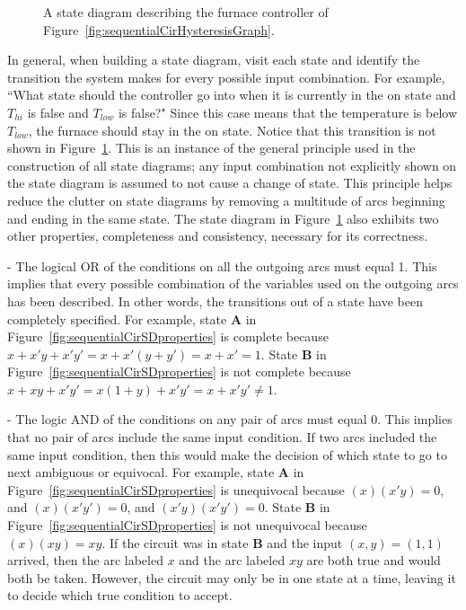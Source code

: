 \begin{figure}[ht]
    \caption{A state diagram describing the furnace controller of
    Figure~\ref{fig:sequentialCirHysteresisGraph}.}
    \label{fig:sequentialCirHysteresisSD}
\end{figure}

In general, when building a state diagram, visit each state
and identify the transition the system makes for every possible
input combination.  For example, ``What state should the controller go into
when it is currently in the on state and $T_{hi}$ is false and $T_{low}$ is
false?" Since this case means that the temperature is below $T_{low}$,
the furnace should stay in the on state.  Notice that this
transition is not shown in Figure~\ref{fig:sequentialCirHysteresisSD}.  This is an
instance of the general principle used in the construction of all state
diagrams; any input combination not explicitly shown on the state diagram
is assumed to not cause a change of state. This principle helps reduce the
clutter on state diagrams by removing a multitude of arcs beginning and ending
in the same state.  The state diagram in Figure~\ref{fig:sequentialCirHysteresisSD} also
exhibits two other properties, completeness and consistency, necessary
for its correctness.

\begin{description}
        \label{page:completeness}
    \item[Completeness] - The logical OR of the conditions on all the outgoing
        arcs must equal 1.  This implies that every possible combination of the
        variables used on the outgoing arcs has been described.  In other words,
        the transitions out of a state have been completely specified.  For
        example, state \textbf{ A} in Figure~\ref{fig:sequentialCirSDproperties}
        is complete because $x + x'y + x'y' = x + x'(y+y') = x + x' = 1$.  State
        \textbf{ B} in Figure~\ref{fig:sequentialCirSDproperties} is not complete because
        $x + xy + x'y' = x(1+y) + x'y' = x + x'y' \ne 1$.

    \item[Unequivocal] - The logic AND of the conditions on any pair of arcs
        must equal 0.  This implies that no pair of arcs include the same input
        condition.  If two arcs included the same input condition, then
        this would make the decision of which state to go to next ambiguous or
        equivocal.  For example, state \textbf{ A} in Figure~\ref{fig:sequentialCirSDproperties}
        is unequivocal because $(x)(x'y) = 0$, and $(x)(x'y')=0$, and
        $(x'y)(x'y') = 0$.  State \textbf{ B} in Figure~\ref{fig:sequentialCirSDproperties} is not
        unequivocal because $(x)(xy) = xy$.  If the circuit was in state \textbf{ B} and
        the input $(x,y)=(1,1)$ arrived, then the arc labeled $x$ and the arc
        labeled $xy$ are both true and would both be taken.  However, the
        circuit may only be in one state at a time, leaving it to decide which
        true condition to accept.
\end{description}

